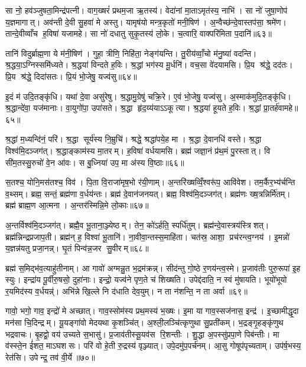 सा नो॒ हव॑ञ्जुषता॒मिन्द्र॑पत्नी। वाग॒ख्षरं॑ प्रथम॒जा ऋ॒तस्य॑। वेदा॑नां मा॒ताऽमृत॑स्य॒ नाभि॑। सा नो॑ जुषा॒णोप॑ य॒ज्ञमागात्। अव॑न्ती दे॒वी सु॒हवा॑ मे अस्तु। यामृष॑यो मन्त्र॒कृतो॑ मनी॒षिण॑। अ॒न्वैच्छ॑न्दे॒वास्तप॑सा॒ श्रमे॑ण। तान्दे॒वीव्वाँच ह॒विषा॑ यजामहे। सा नो॑ दधातु सुकृ॒तस्य॑ लो॒के। च॒त्वारि॒ वाक्परि॑मिता प॒दानि॑॥६३॥

तानि॑ विदुर्ब्राह्म॒णा ये म॑नी॒षिण॑। गुहा॒ त्रीणि॒ निहि॑ता॒ नेङ्ग॑यन्ति। तु॒रीय॑व्वाँ॒चो म॑नु॒ष्या॑ वदन्ति। श्र॒द्धया॒ऽग्निस्समि॑ध्यते। श्र॒द्धया॑ विन्दते ह॒विः। श्र॒द्धां भग॑स्य मू॒र्धनि॑। वच॒सा वे॑दयामसि। प्रि॒य श्र॑द्धे॒ दद॑तः। प्रि॒य श्र॑द्धे॒ दिदा॑सतः। प्रि॒यं भो॒जेषु॒ यज्व॑सु॥६४॥

इ॒दं म॑ उदि॒तङ्कृ॑धि। यथा॑ दे॒वा असु॑रेषु। श्र॒द्धामु॒ग्रेषु॑ चक्रि॒रे। ए॒वं भो॒जेषु॒ यज्व॑सु। अ॒स्माक॑मुदि॒तङ्कृ॑धि। श्र॒द्धान्दे॑वा॒ यज॑मानाः। वा॒युगो॑पा॒ उपा॑सते। श्र॒द्धा हृ॑द॒य्य॑याऽऽकूत्या। श्र॒द्धया॑ हूयते ह॒विः। श्र॒द्धां प्रा॒तर्\mbox{}ह॑वामहे॥६५॥

श्र॒द्धां म॒ध्यन्दि॑नं॒ परि॑। श्र॒द्धा सूर्य॑स्य नि॒म्रुचि॑। श्रद्धे॒ श्रद्धा॑पये॒ह मा। श्र॒द्धा दे॒वानधि॑ वस्ते। श्र॒द्धा विश्व॑मि॒दञ्जग॑त्। श्र॒द्धाङ्काम॑स्य मा॒तरम्। ह॒विषा॑ वर्धयामसि। ब्रह्म॑ जज्ञा॒नं प्र॑थ॒मं पु॒रस्तात्। वि सी॑म॒तस्सु॒रुचो॑ वे॒न आ॑वः। स बु॒ध्निया॑ उप॒ मा अ॑स्य वि॒ष्ठाः॥६६॥

स॒तश्च॒ योनि॒मस॑तश्च॒ विव॑। पि॒ता वि॒राजा॑मृष॒भो र॑यी॒णाम्। अ॒न्तरि॑ख्षव्विँ॒श्वरू॑प॒ आवि॑वेश। तम॒र्कैर॒भ्य॑र्चन्ति व॒थ्सम्। ब्रह्म॒ सन्तं॒ ब्रह्म॑णा व॒र्धय॑न्तः। ब्रह्म॑ दे॒वान॑जनयत्। ब्रह्म॒ विश्व॑मि॒दञ्जग॑त्। ब्रह्म॑णः ख्ष॒त्रन्निर्मि॑तम्। ब्रह्म॑ ब्राह्म॒ण आ॒त्मना। अ॒न्तर॑स्मिन्नि॒मे लो॒काः॥६७॥

अ॒न्तर्विश्व॑मि॒दञ्जग॑त्। ब्रह्मै॒व भू॒ताना॒ञ्ज्येष्ठम्। तेन॒ को॑ऽर्\mbox{}हति॒ स्पर्धि॑तुम्। ब्रह्म॑न्दे॒वास्त्रय॑स्त्रिशत्। ब्रह्म॑न्निन्द्रप्रजाप॒ती। ब्रह्म॑न् ह॒ विश्वा॑ भू॒तानि॑। ना॒वीवा॒न्तस्स॒माहि॑ता। चत॑स्र॒ आशा॒ प्रच॑रन्त्व॒ग्नय॑। इ॒मन्नो॑ य॒ज्ञन्न॑यतु प्रजा॒नन्न्। घृ॒तं पिन्व॑न्न॒जर सु॒वीरम्॥६८॥

ब्रह्म॑ स॒मिद्भ॑व॒त्याहु॑तीनाम्। आ गावो॑ अग्मन्नु॒त भ॒द्रम॑क्रन्न्। सीद॑न्तु गो॒ष्ठे र॒णय॑न्त्व॒स्मे। प्र॒जाव॑तीः पुरु॒रूपा॑ इ॒ह स्युः। इन्द्रा॑य पू॒र्वीरु॒षसो॒ दुहा॑नाः। इन्द्रो॒ यज्व॑ने पृण॒ते च॑ शिख्षति। उपेद्द॑दाति॒ न स्वं मु॑षायति। भूयो॑भूयो र॒यमिद॑स्य व॒र्धयन्न्॑। अभि॑न्ने खि॒ल्ले नि द॑धाति देव॒युम्। न ता न॑शन्ति॒ न ता अर्वा॥६९॥

गावो॒ भगो॒ गाव॒ इन्द्रो॑ मे अच्छात्। गाव॒स्सोम॑स्य प्रथ॒मस्य॑ भ॒ख्षः। इ॒मा या गाव॒स्सज॑नास॒ इन्द्र॑। इ॒च्छामीद्धृ॒दा मन॑सा चि॒दिन्द्रम्। यू॒यङ्गा॑वो मेदयथा कृ॒शञ्चि॑त्। अ॒श्ली॒लञ्चि॑त्कृणुथा सु॒प्रती॑कम्। भ॒द्रङ्गृ॒हङ्कृ॑णुथ भद्रवाचः। बृ॒हद्वो॒ वय॑ उच्यते स॒भासु॑। प्र॒जाव॑तीस्सू॒यव॑स रि॒शन्तीः। शु॒द्धा अ॒पस्सु॑प्रपा॒णे पिब॑न्तीः। मा व॑स्स्ते॒न ई॑शत॒ माऽघशसः। परि॑ वो हे॒ती रु॒द्रस्य॑ वृञ्ज्यात्। उपे॒दमु॑प॒पर्च॑नम्। आ॒सु गोषूप॑पृच्यताम्। उप॑र्\mbox{}ष॒भस्य॒ रेत॑सि। उपेन्द्र॒ तव॑ वी॒र्ये॥७०॥\anuvakamend[च॒रा॒मि॒ कनी॑यो॒ऽन्यानर्पि॑ता प॒दानि॒ यज्व॑सु हवामहे वि॒ष्ठा लो॒कास्सु॒वीर॒मर्वा॒ पिब॑न्ती॒ष्षट्च॑]

